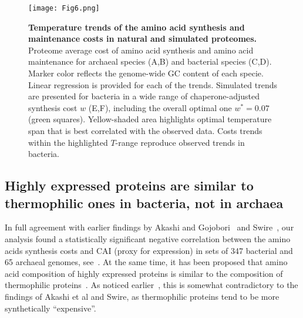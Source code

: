 \documentclass[10pt,letterpaper]{article}
\begin{document}
\begin{figure}[h!]
\texttt{[image: Fig6.png]}
\caption{
{\bf Temperature trends of the amino acid synthesis and maintenance costs in natural and simulated proteomes.}
Proteome average cost of amino acid synthesis and amino acid maintenance for archaeal species (A,B) and bacterial species (C,D). Marker color reflects the genome-wide GC content of each specie. Linear regression is provided for each of the trends.
Simulated trends are presented for bacteria in a wide range of chaperone-adjusted synthesis cost $w$ (E,F), including the overall optimal one $w^*=0.07$ (green squares). Yellow-shaded area highlights optimal temperature span that is best correlated with the observed data. Costs trends within the highlighted $T$-range reproduce observed trends in bacteria.
}
\label{fig:fig6}
\end{figure}

\subsection*{Highly expressed proteins are similar to thermophilic ones in bacteria, not in archaea}

In full agreement with earlier findings by Akashi and Gojobori~\cite{Akashi2002Metabolic} and Swire~\cite{Swire2007Selection}, our analysis found a statistically significant negative correlation between the amino acids synthesis costs and CAI (proxy for expression) in sets of 347 bacterial and 65 archaeal genomes, see~. At the same time, it has been proposed that amino acid composition of highly expressed proteins is similar to the composition of thermophilic proteins~\cite{Cherry2010Highly}. As noticed earlier~\cite{Serohijos2012Protein}, this is somewhat contradictory to the findings of Akashi et al and Swire, as thermophilic proteins tend to be more synthetically ``expensive''.
\end{document}
